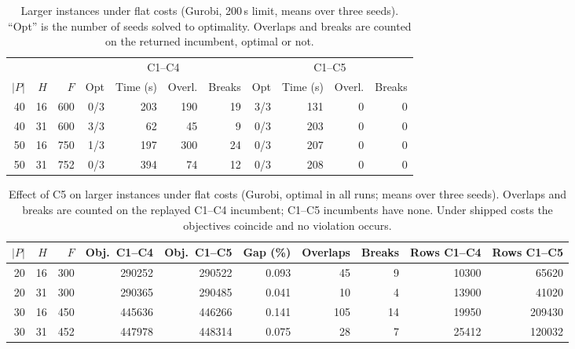 \begin{table}[t]
\centering\small
\caption{Larger instances under flat costs (Gurobi, 200\,s limit, means over
three seeds). ``Opt'' is the number of seeds solved to optimality. Overlaps and
breaks are counted on the returned incumbent, optimal or not.}
\label{tab:c5_p4050}
\begin{tabular}{rrr rrrr rrrr}
\toprule
 & & & \multicolumn{4}{c}{C1--C4} & \multicolumn{4}{c}{C1--C5} \\
\cmidrule(lr){4-7}\cmidrule(lr){8-11}
$|P|$ & $H$ & $F$ & Opt & Time (s) & Overl. & Breaks & Opt & Time (s) & Overl. & Breaks \\
\midrule
40 & 16 & 600 & 0/3 & 203 & 190 & 19 & 3/3 & 131 & 0 & 0 \\
40 & 31 & 600 & 3/3 & 62  & 45  & 9  & 0/3 & 203 & 0 & 0 \\
50 & 16 & 750 & 1/3 & 197 & 300 & 24 & 0/3 & 207 & 0 & 0 \\
50 & 31 & 752 & 0/3 & 394 & 74  & 12 & 0/3 & 208 & 0 & 0 \\
\bottomrule
\end{tabular}
\end{table}

\begin{table}[t]
\centering\small
\caption{Effect of C5 on larger instances under flat costs (Gurobi, optimal in
all runs; means over three seeds). Overlaps and breaks are counted on the
replayed C1--C4 incumbent; C1--C5 incumbents have none. Under shipped costs the
objectives coincide and no violation occurs.}
\label{tab:c5_large}
\begin{tabular}{rrr rr r rr rr}
\toprule
$|P|$ & $H$ & $F$ & Obj.\ C1--C4 & Obj.\ C1--C5 & Gap (\%) & Overlaps & Breaks & Rows C1--C4 & Rows C1--C5 \\
\midrule
20 & 16 & 300 & 290252 & 290522 & 0.093 & 45  & 9  & 10300 & 65620 \\
20 & 31 & 300 & 290365 & 290485 & 0.041 & 10  & 4  & 13900 & 41020 \\
30 & 16 & 450 & 445636 & 446266 & 0.141 & 105 & 14 & 19950 & 209430 \\
30 & 31 & 452 & 447978 & 448314 & 0.075 & 28  & 7  & 25412 & 120032 \\
\bottomrule
\end{tabular}
\end{table}

